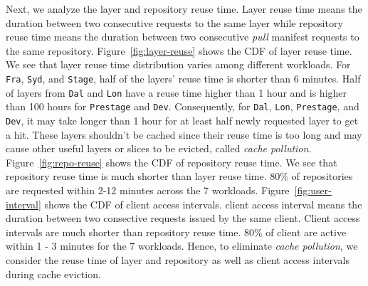 Next, we analyze the layer and repository reuse time.
Layer reuse time means the duration between two consecutive requests to the same layer
while repository reuse time means the duration between two consecutive \emph{pull} manifest requests to the same repository.
Figure~\ref{fig:layer-reuse} shows the CDF of layer reuse time. 
We see that layer reuse time distribution varies among different workloads.
For \texttt{Fra}, \texttt{Syd}, and \texttt{Stage},
half of the layers' reuse time is shorter than 6 minutes.
Half of layers from \texttt{Dal} and \texttt{Lon} have a reuse time higher than 1 hour and is higher than 100 hours for \texttt{Prestage} and \texttt{Dev}.
Consequently, for \texttt{Dal}, \texttt{Lon}, \texttt{Prestage}, and \texttt{Dev}, 
it may take longer than 1 hour for at least half newly requested layer to get a hit. 
These layers shouldn't be cached since their reuse time is too long and may cause other useful layers or slices to be evicted, called \emph{cache pollution}.
Figure~\ref{fig:repo-reuse} shows the CDF of repository reuse time.
We see that repository reuse time is much shorter than layer reuse time.
80\% of repositories are requested within 2-12 minutes across the 7 workloads.
Figure~\ref{fig:user-interval} shows the CDF of client access intervals.
client access interval means the duration between two consective requests issued by the same client.
Client access intervals are much shorter than repository reuse time.
80\% of client are active within 1 - 3 minutes for the 7 workloads. 
Hence, to eliminate \emph{cache pollution},
we consider the reuse time of layer and repository as well as client access intervals during cache eviction.